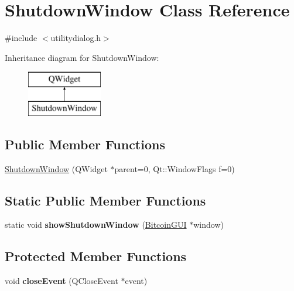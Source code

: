 \hypertarget{class_shutdown_window}{}\section{Shutdown\+Window Class Reference}
\label{class_shutdown_window}


{\ttfamily \#include $<$utilitydialog.\+h$>$}

Inheritance diagram for Shutdown\+Window\+:\begin{figure}[H]
\begin{center}
\leavevmode
\includegraphics[height=2.000000cm]{class_shutdown_window}
\end{center}
\end{figure}
\subsection*{Public Member Functions}
\begin{DoxyCompactItemize}
\item 
\mbox{\hyperlink{class_shutdown_window_a9bf9b087649914f963f37a1ea235c969}{Shutdown\+Window}} (Q\+Widget $\ast$parent=0, Qt\+::\+Window\+Flags f=0)
\end{DoxyCompactItemize}
\subsection*{Static Public Member Functions}
\begin{DoxyCompactItemize}
\item 
\mbox{\label{class_shutdown_window_ad53d08169d8d97a58d72cc343502fd23}} 
static void {\bfseries show\+Shutdown\+Window} (\mbox{\hyperlink{class_bitcoin_g_u_i}{Bitcoin\+G\+UI}} $\ast$window)
\end{DoxyCompactItemize}
\subsection*{Protected Member Functions}
\begin{DoxyCompactItemize}
\item 
\mbox{\label{class_shutdown_window_aa0ad00e74fefcdb13a4c5bc3267ae285}} 
void {\bfseries close\+Event} (Q\+Close\+Event $\ast$event)
\end{DoxyCompactItemize}


